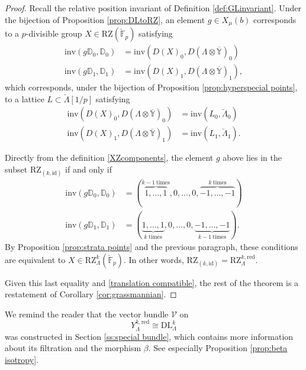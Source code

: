 \documentclass[11pt]{alggeom}
\newcommand{\iso}{\cong}
\newcommand{\red}{\mathrm{red}}
\newcommand{\F}{\mathbb F}
\begin{document}
\begin{proof}
Recall the relative position invariant  of Definition \ref{def:GLinvariant}.
Under the bijection of Proposition \ref{prop:DLtoRZ}, an element $g\in X_\mu(b)$ corresponds to a $p$-divisible group $X\in  \mathrm{RZ}(\breve{\F}_p)$ satisfying
 \begin{align*}
\mathrm{inv}( g \mathbb{D}_0 ,  \mathbb{D}_0 )   
& = 
\mathrm{inv}(D(X)_0 , D(\Lambda \otimes \overline{\mathbb{Y}} )_0  )    \\
 \mathrm{inv}( g \mathbb{D}_1 ,  \mathbb{D}_1 )   
 & = 
 \mathrm{inv}(D(X)_1 , D(\Lambda \otimes \overline{\mathbb{Y}} )_1  )  ,
 \end{align*}
 which corresponds, under the bijection of Proposition \ref{prop:hyperspecial points},  to a lattice $L \subset \breve{\Lambda}[1/p]$ satisfying
 \begin{align*}
\mathrm{inv}(D(X)_0 , D(\Lambda \otimes \overline{\mathbb{Y}} )_0  )   
& = 
\mathrm{inv}(L_0  , \breve{\Lambda}_0   )    \\
 \mathrm{inv}(D(X)_1 , D(\Lambda \otimes \overline{\mathbb{Y}} )_1  ) 
 & =    
 \mathrm{inv}(L_1  , \breve{\Lambda}_1 ).
 \end{align*}

Directly from the definition \eqref{XZcomponents}, the element $g$ above lies in the subset $\mathrm{RZ}_{(k,\mathrm{id})}$ if and only if 
 \begin{align*}
  \mathrm{inv}( g \mathbb{D}_0 ,  \mathbb{D}_0 )  
  & =   ( \overbrace{1,\ldots, 1}^{k-1\mathrm{\ times}}, 0,\ldots, 0 , \overbrace{-1,\ldots, -1}^{k\mathrm{\ times}} )  \\
   \mathrm{inv}( g \mathbb{D}_1 ,  \mathbb{D}_1 )  
   & =    ( \underbrace{1,\ldots, 1}_{k\mathrm{\ times}}, 0,\ldots, 0 , \underbrace{-1,\ldots, -1}_{k-1\mathrm{\ times}} ).
 \end{align*}
By Proposition \ref{prop:strata points} and  the previous paragraph, these conditions are equivalent to $X\in \mathrm{RZ}_\Lambda^k(\breve{\F}_p)$. 
In other words, $\mathrm{RZ}_{(k,\mathrm{id})} = \mathrm{RZ}_\Lambda^{k,\red}$.

Given this last equality and \eqref{translation compatible}, the rest of the theorem is  a restatement of Corollary \ref{cor:grassmannian}.
\end{proof}





\begin{remark}
We remind the reader that the  vector bundle $\mathscr{V}$ on 
\[
 Y_\Lambda^{k,\red} \iso  \mathrm{DL}_\Lambda^k
 \]
   was constructed in Section \ref{ss:special bundle},
which contains more information about its filtration and the morphism  $\beta$.  See especially Proposition \ref{prop:beta isotropy}.
\end{remark}
\end{document}
